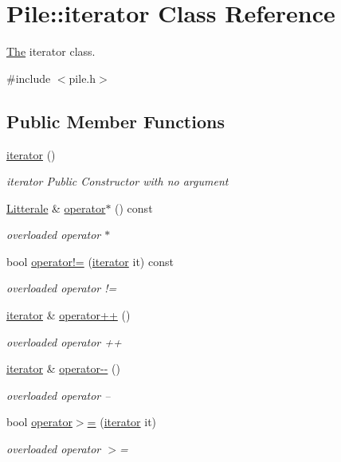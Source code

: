 \hypertarget{class_pile_1_1iterator}{}\section{Pile\+:\+:iterator Class Reference}
\label{class_pile_1_1iterator}


\hyperlink{class_the}{The} iterator class.  




{\ttfamily \#include $<$pile.\+h$>$}

\subsection*{Public Member Functions}
\begin{DoxyCompactItemize}
\item 
\hyperlink{class_pile_1_1iterator_a840f05175548dd9ac7bb595206f0044f}{iterator} ()\hypertarget{class_pile_1_1iterator_a840f05175548dd9ac7bb595206f0044f}{}\label{class_pile_1_1iterator_a840f05175548dd9ac7bb595206f0044f}

\begin{DoxyCompactList}\small\item\em iterator Public Constructor with no argument \end{DoxyCompactList}\item 
\hyperlink{class_litterale}{Litterale} \& \hyperlink{class_pile_1_1iterator_a5a84d0211e5cfb4ddb45661d7e940e87}{operator$\ast$} () const 
\begin{DoxyCompactList}\small\item\em overloaded operator $\ast$ \end{DoxyCompactList}\item 
bool \hyperlink{class_pile_1_1iterator_abfe0e25a2ebc5f3188c7a13f09d19129}{operator!=} (\hyperlink{class_pile_1_1iterator}{iterator} it) const 
\begin{DoxyCompactList}\small\item\em overloaded operator != \end{DoxyCompactList}\item 
\hyperlink{class_pile_1_1iterator}{iterator} \& \hyperlink{class_pile_1_1iterator_a05b171f7019504d6fb1b6a9a183bd75b}{operator++} ()
\begin{DoxyCompactList}\small\item\em overloaded operator ++ \end{DoxyCompactList}\item 
\hyperlink{class_pile_1_1iterator}{iterator} \& \hyperlink{class_pile_1_1iterator_a2885303b73c9f5aeaece13985d138773}{operator-\/-\/} ()
\begin{DoxyCompactList}\small\item\em overloaded operator -- \end{DoxyCompactList}\item 
bool \hyperlink{class_pile_1_1iterator_ae984b2c3b4144fbaad3f4e0540b3f9ab}{operator$>$=} (\hyperlink{class_pile_1_1iterator}{iterator} it)
\begin{DoxyCompactList}\small\item\em overloaded operator $>$= \end{DoxyCompactList}\end{DoxyCompactItemize}
